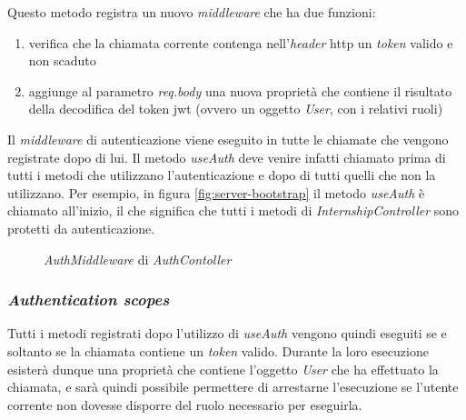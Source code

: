\noindent
Questo metodo registra un nuovo \textit{middleware} che ha due funzioni:
\begin{enumerate}
	\item verifica che la chiamata corrente contenga nell'\textit{header} \acrshort{http} un \textit{token} valido e non scaduto
	\item aggiunge al parametro \textit{req.body} una nuova proprietà che contiene il risultato della decodifica del token \acrshort{jwt} (ovvero un oggetto \textit{User}, con i relativi ruoli)
\end{enumerate}
Il \textit{middleware} di autenticazione viene eseguito in tutte le chiamate che vengono registrate dopo di lui. Il metodo \textit{useAuth} deve venire infatti chiamato prima di tutti i metodi che utilizzano l'autenticazione e dopo di tutti quelli che non la utilizzano. Per esempio, in figura \ref{fig:server-bootstrap} il metodo \textit{useAuth} è chiamato all'inizio, il che significa che tutti i metodi di \textit{InternshipController} sono protetti da autenticazione.

\begin{figure}[H] 
	\centering    
	
	\caption[\textit{AuthMiddleware} di \textit{AuthContoller}]{\textit{AuthMiddleware} di \textit{AuthContoller}}
	\label{fig:server-auth-middleware}
\end{figure}

\subsubsection{\textit{Authentication scopes}}
\label{server:scopes}
Tutti i metodi registrati dopo l'utilizzo di \textit{useAuth} vengono quindi eseguiti se e soltanto se la chiamata contiene un \textit{token} valido. Durante la loro esecuzione esisterà dunque una proprietà che contiene l'oggetto \textit{User} che ha effettuato la chiamata, e sarà quindi possibile permettere di arrestarne l'esecuzione se l'utente corrente non dovesse disporre del ruolo necessario per eseguirla.

